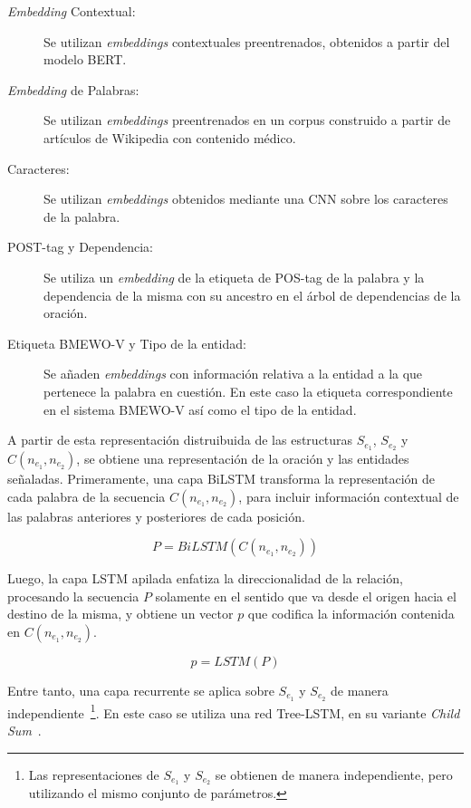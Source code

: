 \begin{description}
	\item[\textit{Embedding} Contextual:] Se utilizan \textit{embeddings} contextuales preentrenados, obtenidos a partir del modelo BERT.
	
	\item[\textit{Embedding} de Palabras:] Se utilizan \textit{embeddings} preentrenados en un corpus construido a partir de artículos de Wikipedia con contenido médico.
	
	\item[Caracteres:] Se utilizan \textit{embeddings} obtenidos mediante una CNN sobre los caracteres de la palabra.
	
	\item[POST-tag y Dependencia:] Se utiliza un \textit{embedding} de la etiqueta de POS-tag de la palabra y la dependencia de la misma con su ancestro en el árbol de dependencias de la oración.
	
	\item[Etiqueta BMEWO-V y Tipo de la entidad:] Se añaden \textit{embeddings} con información relativa a la entidad a la que pertenece la palabra en cuestión.
	En este caso la etiqueta correspondiente en el sistema BMEWO-V así como el tipo de la entidad.
	
\end{description}

A partir de esta representación distruibuida de las estructuras $S_{e_1}$, $S_{e_2}$ y $C(n_{e_1}, n_{e_2})$, se obtiene una representación de la oración y las entidades señaladas.
Primeramente, una capa BiLSTM transforma la representación de cada palabra de la secuencia $C(n_{e_1}, n_{e_2})$, para incluir información contextual de las palabras anteriores y posteriores de cada posición.

\begin{equation*}
	P = BiLSTM(C(n_{e_1}, n_{e_2}))
\end{equation*}

Luego, la capa LSTM apilada enfatiza la direccionalidad de la relación, procesando la secuencia $P$ solamente en el sentido que va desde el origen hacia el destino de la misma, y obtiene un vector $p$ que codifica la información contenida en $C(n_{e_1}, n_{e_2})$.

\begin{equation*}
	p = LSTM(P)
\end{equation*}

Entre tanto, una capa recurrente se aplica sobre $S_{e_1}$ y $S_{e_2}$ de manera independiente~\footnote{Las representaciones de $S_{e_1}$ y $S_{e_2}$ se obtienen de manera independiente, pero utilizando el mismo conjunto de parámetros.}.
En este caso se utiliza una red Tree-LSTM, en su variante \textit{Child Sum}~\cite{tai2015improved}.

